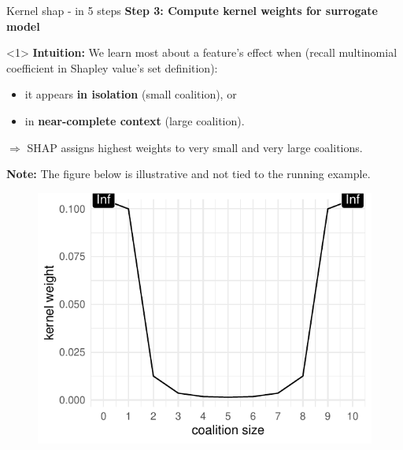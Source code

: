 \documentclass[10pt,compress,t,notes=noshow, xcolor=table]{beamer}
\begin{document}
\begin{frame}{Kernel shap - in 5 steps}
\textbf{Step 3: Compute kernel weights for surrogate model}\\\medskip

\begin{onlyenv}<1>
\textbf{Intuition:}  
We learn most about a feature’s effect when (recall multinomial coefficient in Shapley value's set definition):
\begin{itemize}
  \item it appears \textbf{in isolation} (small coalition), or
  \item in \textbf{near-complete context} (large coalition).
\end{itemize}
\(\Rightarrow\) SHAP assigns highest weights to very small and very large coalitions.

\medskip
\textbf{Note:} The figure below is illustrative and not tied to the running example.

\begin{figure}
    \centering
    \includegraphics[width=0.5\columnwidth]{figure_man/kernel-weights.pdf}
\end{figure}
\end{onlyenv}



\end{frame}
\end{document}
